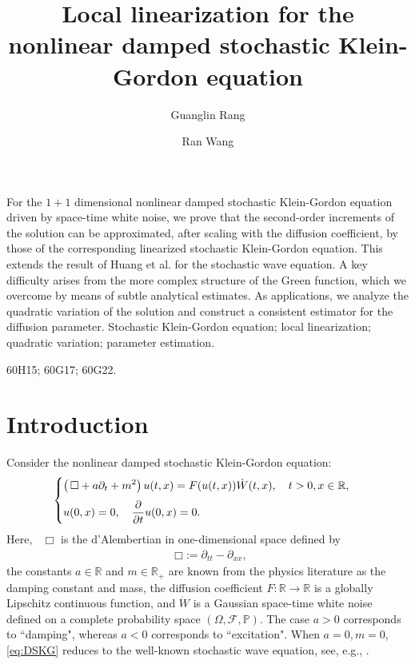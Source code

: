 \documentclass[11pt,reqno]{amsart}
\title[Local linearization  for the damped stochastic Klein-Gordon equation]{Local linearization for  the   nonlinear  damped stochastic Klein-Gordon equation}
\date{}
\numberwithin{equation}{section}
\newcommand{\1}{{\bf 1}}
\newcommand{\2}{{\bf 2}}
\newcommand*\DAlambert{\mathop{} \mathbin\Box}%
\begin{document}
 
 
    \author[G. Rang]{Guanglin Rang}
    \address[]{Guanglin Rang, School of Mathematics and Statistics,  Wuhan University,  Wuhan, 430072,
    China.}

    \author[R. Wang]{Ran Wang}
    \address[]{Ran Wang, School of Mathematics and Statistics,  Wuhan University,  Wuhan, 430072,
    China.}
 
 
    \maketitle
       For the $1+1$ dimensional nonlinear damped stochastic Klein-Gordon equation driven by space-time white noise, we  prove that the second-order increments of the solution can be approximated,  after scaling with the diffusion coefficient,  by those of the corresponding linearized stochastic Klein-Gordon equation.    This extends the result of Huang et al. \cite{HOO2024} for the stochastic wave equation.  A key difficulty arises from the more  complex structure of the Green function, which we overcome by means of subtle analytical estimates.     As applications, we analyze the quadratic variation of the solution and construct a consistent estimator for the diffusion parameter.
              \vskip0.3cm
  {Stochastic Klein-Gordon equation; local linearization; quadratic variation; parameter estimation.}
 \vskip0.3cm


 {60H15; 60G17; 60G22.}
    \section{Introduction}
Consider the nonlinear    damped stochastic Klein-Gordon equation:
      \begin{equation}\label{eq:DSKG}
\begin{cases}
\vspace{6pt}
\displaystyle{\left (\DAlambert+a\partial_t+m^2 \right)u(t,x)= F(u(t,x))\dot    W(t,x), \quad t>0, x \in \mathbb R,}\\
\displaystyle{u(0, x) = 0, \quad \frac{\partial}{\partial t} u(0, x) = 0.}
\end{cases}
\end{equation}
Here,  $\DAlambert$  is the d'Alembertian in one-dimensional space  defined by 
\begin{align}\label{eq dAl}
\DAlambert:=\partial_{tt}-\partial_{xx},
\end{align} 
the constants $a \in \mathbb R$ and $m\in \mathbb R_+$ are known from the physics literature as the damping constant and mass, the diffusion coefficient   $F:\mathbb R\rightarrow\mathbb R$  is a   globally  Lipschitz continuous function, and $\dot W$ is a Gaussian space-time white noise defined on a complete probability space $(\Omega, \mathcal {F}, \mathbb P)$.   The case $a>0$ corresponds to ``damping", whereas    $a<0$  corresponds to ``excitation".  
   When  $a=0, m=0$, \eqref{eq:DSKG} reduces to the well-known stochastic wave equation, see, e.g.,    \cite{D99, DS15, Walsh86}.
   
\end{document}
